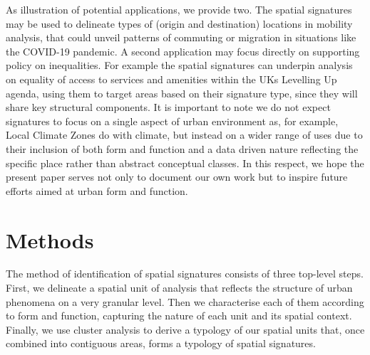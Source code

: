 \documentclass[fleqn,10pt]{wlscirep}
\begin{document}
As illustration of potential applications, we provide two. The spatial
signatures may be used to delineate types of
(origin and destination) locations in mobility analysis, that could unveil patterns
of commuting or migration in situations like the COVID-19 pandemic. A second
application may focus directly on supporting policy on inequalities. For
example the spatial signatures can underpin analysis on equality of access
to services and amenities within the UKs Levelling Up
agenda\cite{luwp22}, using them to target
areas based on their signature type, since they will share key structural
components. It is important to note we do not expect signatures to focus on a single
aspect of urban environment as, for example, Local Climate Zones \cite{stewart2012local}
do with climate, but instead on a wider range of
uses due to their inclusion of both form and function and a data driven nature reflecting
the specific place rather than abstract conceptual classes.
In this respect, we hope the present paper serves not only to document our own
work but to inspire future efforts aimed at urban form and function.










\section*{Methods}

The method of identification of spatial signatures consists of three top-level steps.
First, we delineate a spatial unit of analysis that reflects the structure of
urban phenomena on a very granular level. Then we characterise each of them
according to form and function, capturing the nature of each unit and its spatial
context. Finally, we use cluster analysis to derive a typology of our spatial units
that, once combined into contiguous areas, forms a typology of spatial signatures.
\end{document}
